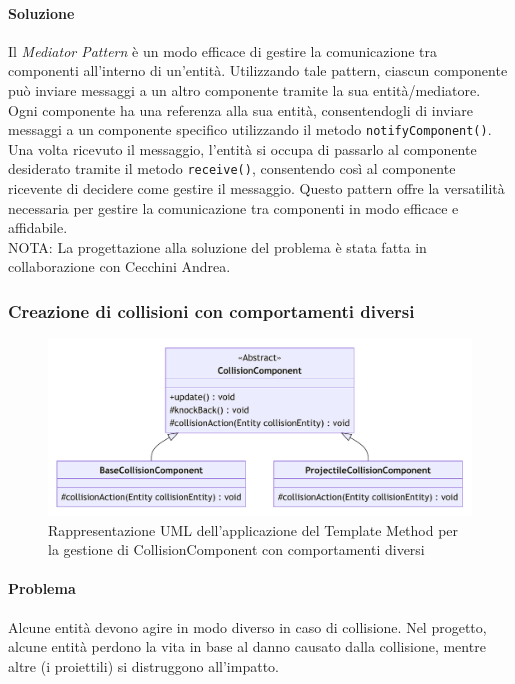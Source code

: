 \documentclass[a4paper,12pt]{report}
\begin{document}
\paragraph{Soluzione} Il \textit{Mediator Pattern} è un modo efficace di gestire la comunicazione tra componenti
all'interno di un'entità. Utilizzando tale pattern, ciascun componente può inviare messaggi a un altro componente 
tramite la sua entità/mediatore. Ogni componente ha una referenza alla sua entità, consentendogli di inviare messaggi
a un componente specifico utilizzando il metodo \texttt{notifyComponent()}. Una volta ricevuto il messaggio, l'entità 
si occupa di passarlo al componente desiderato tramite il metodo \texttt{receive()}, consentendo così al componente ricevente 
di decidere come gestire il messaggio. Questo pattern offre la versatilità necessaria per gestire la comunicazione tra componenti 
in modo efficace e affidabile. \\
NOTA: La progettazione alla soluzione del problema è stata fatta in collaborazione con Cecchini Andrea.

\subsubsection{Creazione di collisioni con comportamenti diversi}

\begin{figure}[H]
\centering{}
\includegraphics[width=\textwidth]{img/CollisionComponentUML}
\caption{Rappresentazione UML dell'applicazione del Template Method per la gestione di CollisionComponent con comportamenti diversi}
\end{figure}
	
\paragraph{Problema} Alcune entità devono agire in modo diverso in caso di collisione. Nel progetto, 
alcune entità perdono la vita in base al danno causato dalla collisione, mentre altre (i proiettili) si distruggono all'impatto.
\end{document}
